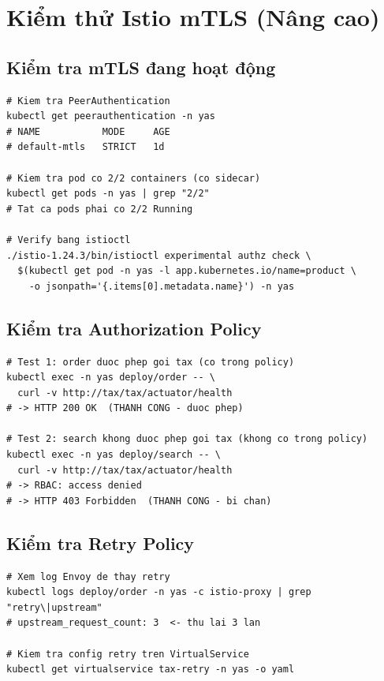 \section{Kiểm thử Istio mTLS (Nâng cao)}

\subsection{Kiểm tra mTLS đang hoạt động}

\begin{lstlisting}[style=bashstyle, caption=Verify mTLS STRICT mode]
# Kiem tra PeerAuthentication
kubectl get peerauthentication -n yas
# NAME           MODE     AGE
# default-mtls   STRICT   1d

# Kiem tra pod co 2/2 containers (co sidecar)
kubectl get pods -n yas | grep "2/2"
# Tat ca pods phai co 2/2 Running

# Verify bang istioctl
./istio-1.24.3/bin/istioctl experimental authz check \
  $(kubectl get pod -n yas -l app.kubernetes.io/name=product \
    -o jsonpath='{.items[0].metadata.name}') -n yas
\end{lstlisting}

\subsection{Kiểm tra Authorization Policy}

\begin{lstlisting}[style=bashstyle, caption=Test Authorization Policy]
# Test 1: order duoc phep goi tax (co trong policy)
kubectl exec -n yas deploy/order -- \
  curl -v http://tax/tax/actuator/health
# -> HTTP 200 OK  (THANH CONG - duoc phep)

# Test 2: search khong duoc phep goi tax (khong co trong policy)
kubectl exec -n yas deploy/search -- \
  curl -v http://tax/tax/actuator/health
# -> RBAC: access denied
# -> HTTP 403 Forbidden  (THANH CONG - bi chan)
\end{lstlisting}

\subsection{Kiểm tra Retry Policy}

\begin{lstlisting}[style=bashstyle, caption=Test Retry Policy]
# Xem log Envoy de thay retry
kubectl logs deploy/order -n yas -c istio-proxy | grep "retry\|upstream"
# upstream_request_count: 3  <- thu lai 3 lan

# Kiem tra config retry tren VirtualService
kubectl get virtualservice tax-retry -n yas -o yaml
\end{lstlisting}

